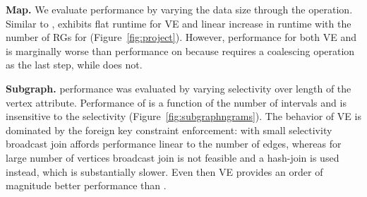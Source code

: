 {\bf Map.}  We evaluate  performance by varying the data
size through the  operation.  Similar to ,
 exhibits flat runtime for VE and linear increase in
runtime with the number of RGs for \sg (Figure~\ref{fig:project}).
However, performance for both VE and \sg is marginally worse than
performance on  because  requires a coalescing
operation as the last step, while  does not.

{\bf Subgraph.}   performance was evaluated by varying
selectivity over length of the vertex attribute.  Performance of \sg
is a function of the number of intervals and is insensitive to the
selectivity (Figure~\ref{fig:subgraphngrams}).  The behavior of VE is
dominated by the foreign key constraint enforcement: with small
selectivity broadcast join affords performance linear to the number of
edges, whereas for large number of vertices broadcast join is not
feasible and a hash-join is used instead, which is substantially
slower.  Even then VE provides an order of magnitude better
performance than \sg.

